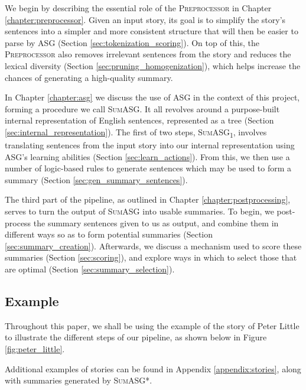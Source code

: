 We begin by describing the essential role of the \textsc{Preprocessor} in Chapter \ref{chapter:preprocessor}. Given an input story, its goal is to simplify the story's sentences into a simpler and more consistent structure that will then be easier to parse by ASG (Section \ref{sec:tokenization_scoring}). On top of this, the \textsc{Preprocessor} also removes irrelevant sentences from the story and reduces the lexical diversity (Section \ref{sec:pruning_homogenization}), which helps increase the chances of generating a high-quality summary.

In Chapter \ref{chapter:asg} we discuss the use of ASG in the context of this project, forming a procedure we call \textsc{SumASG}. It all revolves around a purpose-built internal representation of English sentences, represented as a tree (Section \ref{sec:internal_representation}). The first of two steps, \textsc{SumASG\textsubscript{1}}, involves translating sentences from the input story into our internal representation using ASG's learning abilities (Section \ref{sec:learn_actions}). From this, we then use a number of logic-based rules to generate sentences which may be used to form a summary (Section \ref{sec:gen_summary_sentences}).

The third part of the pipeline, as outlined in Chapter \ref{chapter:postprocessing}, serves to turn the output of \textsc{SumASG} into usable summaries. To begin, we post-process the summary sentences given to us as output, and combine them in different ways so as to form potential summaries (Section \ref{sec:summary_creation}). Afterwards, we discuss a mechanism used to score these summaries (Section \ref{sec:scoring}), and explore ways in which to select those that are optimal (Section \ref{sec:summary_selection}).

\subsection{Example}

Throughout this paper, we shall be using the example of the story of Peter Little to illustrate the different steps of our pipeline, as shown below in Figure \ref{fig:peter_little}.

Additional examples of stories can be found in Appendix \ref{appendix:stories}, along with summaries generated by \textsc{SumASG*}.

